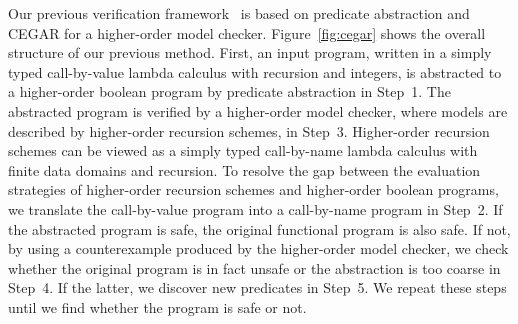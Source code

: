 Our previous verification framework~\cite{KobayashiPLDI2011} is based on
predicate abstraction and CEGAR for a higher-order model checker.
Figure~\ref{fig:cegar} shows the overall structure of our previous
method.  First, an input program, written in a simply typed
call-by-value lambda calculus with recursion and integers, is abstracted
to a higher-order boolean program by predicate abstraction in Step~1.
The abstracted program is verified by a higher-order model checker,
where models are described by higher-order recursion schemes, in Step~3.
Higher-order recursion schemes can be viewed as a simply typed
call-by-name lambda calculus with finite data domains and recursion.  To
resolve the gap between the evaluation strategies of higher-order
recursion schemes and higher-order boolean programs, we translate the
call-by-value program into a call-by-name program in Step~2. If the
abstracted program is safe, the original functional program is also
safe.  If not, by using a counterexample produced by the higher-order
model checker, we check whether the original program is in fact unsafe
or the abstraction is too coarse in Step~4. If the latter, we discover
new predicates in Step~5.  We repeat these steps until we find whether
the program is safe or not.

